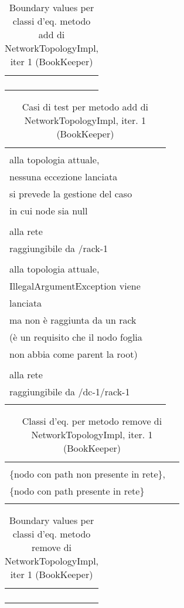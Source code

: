 \documentclass[10pt, a4paper]{article}
\newcommand{\Intmaketable}[4]{
	\begin{longtable}{#3}
	#4
	\caption{#2}
	\label{#1}
	\end{longtable}
}
\newcommand{\Intceqtable}[3]{
	\Intmaketable{#1}{#2}{|l|l|}{
	\hline
	\thead{Parametro formale} & \thead{Classi d'equivalenza} \\
	\hline
	\hline
	#3
	\hline}
}
\newcommand{\Intbvtable}[3]{
	\Intmaketable{#1}{#2}{|l|l|l|}{
	\hline
	\thead{Parametro formale} & \thead{Classe d'equivalenza} & \thead{Boundary value}\\
	\hline
	\hline
	#3
	\hline}
}
\newcommand{\Inttestctable}[3]{
	\Intmaketable{#1}{#2}{|l|l|l|}{
	\hline
	\thead{Input} & \thead{Esito atteso} & \thead{Motivazione}\\
	\hline
	\hline
	#3
	\hline}
}
\newcommand{\Intceqcaption}[4]{Classi d'eq. per metodo #1 di #2, iter. #3 (#4)}
\newcommand{\Intbvcaption}[4]{Boundary values per classi d'eq. metodo #1 di #2, iter #3 (#4)}
\newcommand{\Inttestccaption}[4]{Casi di test per metodo #1 di #2, iter. #3 (#4)}
\newcommand{\gettablelabel}[5]{table:#1:#2:#3:iter#4:proj#5}
\newcommand{\ceqtable}[5]{
	\Intceqtable{\gettablelabel{ceq}{#1}{#2}{#3}{#4}}
		{\Intceqcaption{#1}{#2}{#3}{#4}}
		{#5}
}
\newcommand{\bvtable}[5]{
	\Intbvtable{\gettablelabel{bv}{#1}{#2}{#3}{#4}}
		{\Intbvcaption{#1}{#2}{#3}{#4}}
		{#5}
}
\newcommand{\testctable}[5]{
	\Inttestctable{\gettablelabel{testc}{#1}{#2}{#3}{#4}}
		{\Inttestccaption{#1}{#2}{#3}{#4}}
		{#5}
}
\newcommand{\tcell}{\makecell[tl]}
\newcommand{\newtrow}{\\ \hline}
\def\bookkeeper{BookKeeper}
\newcommand{\ceq}[1]{\{#1\}}
\begin{document}
	\bvtable{add}{NetworkTopologyImpl}{1}{\bookkeeper}{
			\tcell{node} & \tcell{\ceq{null}} & \tcell{null}
		\newtrow
			\tcell{node} & \tcell{\ceq{nodo con path invalido}} & \tcell{Node("/bookie-1")}
		\newtrow
			\tcell{node} & \tcell{\ceq{nodo con path valido}} & \tcell{Node("/rack-1/bookie-1")}
		\newtrow
	}
	
	\testctable{add}{NetworkTopologyImpl}{1}{\bookkeeper}{
			\tcell{null} & \tcell{Nessuna variazione rispetto\\ alla topologia attuale,\\ nessuna 
			eccezione lanciata} & \tcell{Specifica della documentazione:\\ si prevede la gestione del 
			caso\\ in cui node sia null}
		\newtrow
			\tcell{buildNode("/rack-1","bookie-1")} & \tcell{Aggiunta con successo del nodo\\ alla rete} 
			& \tcell{Il nodo è una foglia (un server bk)\\ raggiungibile da /rack-1}
		\newtrow
			\tcell{buildNode("/","bookie-2")} & \tcell{Nessuna variazione rispetto \\ alla topologia 
			attuale, \\IllegalArgumentException viene\\ lanciata} & 
			\tcell{Il nodo è una foglia (un server bk)\\ ma non è raggiunta da un rack \\
			(è un requisito che il nodo foglia\\ non abbia come parent la root) }
		\newtrow
			\tcell{buildNode("/dc-1/rack-1", "bookie-3")} & \tcell{Aggiunta con successo del nodo\\ alla 
			rete} & \tcell{Il nodo è una foglia (un server bk)\\ raggiungibile da /dc-1/rack-1}
		\newtrow
	}
	
	\ceqtable{remove}{NetworkTopologyImpl}{1}{\bookkeeper}{
			\tcell{node} & \tcell{\ceq{null}, \\ \ceq{nodo con path non presente in rete},\\ \ceq{nodo 
			con path presente in rete}}
		\newtrow
	}
	
	\pagebreak
	
	\bvtable{remove}{NetworkTopologyImpl}{1}{\bookkeeper}{
			\tcell{node} & \tcell{\ceq{null}} & \tcell{null} 
		\newtrow
			\tcell{node} & \tcell{\ceq{nodo con path non presente in rete}} & \tcell{Node("/rack-1/bookie-1")}
		\newtrow
			\tcell{node} & \tcell{\ceq{nodo con path presente in rete}} & \tcell{Node("/rack-1/bookie-2")}
		\newtrow
	}
	
\end{document}
